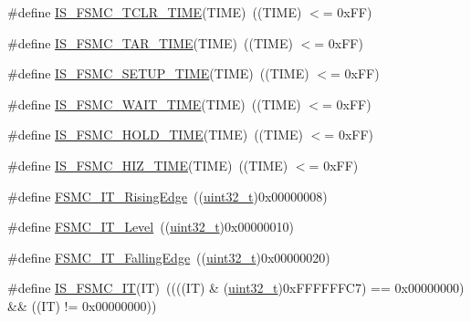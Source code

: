 \begin{DoxyCompactItemize}
\item 
\#define \hyperlink{group___f_s_m_c___t_c_l_r___setup___time_ga324848d0d9c0d2aad7ab70873b4a15e9}{I\+S\+\_\+\+F\+S\+M\+C\+\_\+\+T\+C\+L\+R\+\_\+\+T\+I\+ME}(T\+I\+ME)~((T\+I\+ME) $<$= 0x\+F\+F)
\item 
\#define \hyperlink{group___f_s_m_c___t_a_r___setup___time_ga5b9e0f64c44ab68afca90cd28dedd8e3}{I\+S\+\_\+\+F\+S\+M\+C\+\_\+\+T\+A\+R\+\_\+\+T\+I\+ME}(T\+I\+ME)~((T\+I\+ME) $<$= 0x\+F\+F)
\item 
\#define \hyperlink{group___f_s_m_c___setup___time_ga4f2fbb8f6ec492cc241a49c468e0d98d}{I\+S\+\_\+\+F\+S\+M\+C\+\_\+\+S\+E\+T\+U\+P\+\_\+\+T\+I\+ME}(T\+I\+ME)~((T\+I\+ME) $<$= 0x\+F\+F)
\item 
\#define \hyperlink{group___f_s_m_c___wait___setup___time_ga5c0efc48afb916ceff32868940f81613}{I\+S\+\_\+\+F\+S\+M\+C\+\_\+\+W\+A\+I\+T\+\_\+\+T\+I\+ME}(T\+I\+ME)~((T\+I\+ME) $<$= 0x\+F\+F)
\item 
\#define \hyperlink{group___f_s_m_c___hold___setup___time_gab2abc8eb967495f2a2bafec8162d6385}{I\+S\+\_\+\+F\+S\+M\+C\+\_\+\+H\+O\+L\+D\+\_\+\+T\+I\+ME}(T\+I\+ME)~((T\+I\+ME) $<$= 0x\+F\+F)
\item 
\#define \hyperlink{group___f_s_m_c___hi_z___setup___time_gaeb6295e8cc1a524f060c5e780f868033}{I\+S\+\_\+\+F\+S\+M\+C\+\_\+\+H\+I\+Z\+\_\+\+T\+I\+ME}(T\+I\+ME)~((T\+I\+ME) $<$= 0x\+F\+F)
\item 
\#define \hyperlink{group___f_s_m_c___interrupt__sources_gac483854bd6f90d8c7899a597a0c0ab1a}{F\+S\+M\+C\+\_\+\+I\+T\+\_\+\+Rising\+Edge}~((\hyperlink{_p_e___types_8h_a33594304e786b158f3fb30289278f5af}{uint32\+\_\+t})0x00000008)
\item 
\#define \hyperlink{group___f_s_m_c___interrupt__sources_ga59b5839854074008fb36fa86ec50a0c7}{F\+S\+M\+C\+\_\+\+I\+T\+\_\+\+Level}~((\hyperlink{_p_e___types_8h_a33594304e786b158f3fb30289278f5af}{uint32\+\_\+t})0x00000010)
\item 
\#define \hyperlink{group___f_s_m_c___interrupt__sources_ga8e4b9589c9981c900b5f2e84581a9693}{F\+S\+M\+C\+\_\+\+I\+T\+\_\+\+Falling\+Edge}~((\hyperlink{_p_e___types_8h_a33594304e786b158f3fb30289278f5af}{uint32\+\_\+t})0x00000020)
\item 
\#define \hyperlink{group___f_s_m_c___interrupt__sources_ga40a38f097a75f27a700e626905fa9a38}{I\+S\+\_\+\+F\+S\+M\+C\+\_\+\+IT}(IT)~((((IT) \& (\hyperlink{_p_e___types_8h_a33594304e786b158f3fb30289278f5af}{uint32\+\_\+t})0x\+F\+F\+F\+F\+F\+F\+C7) == 0x00000000) \&\& ((\+I\+T) != 0x00000000))
\item 

\end{DoxyCompactItemize}
